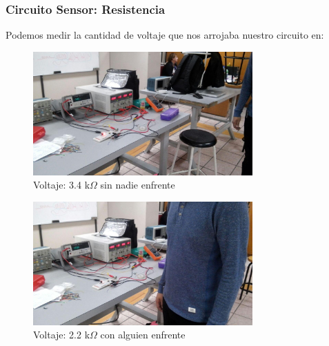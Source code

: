 \documentclass[12pt, fleqn]{article}                            %
\theoremstyle{break}                                            %
\begin{document}
        \clearpage
        \subsubsection{Circuito Sensor: Resistencia}

            Podemos medir la cantidad de voltaje que nos arrojaba nuestro circuito 
            en:
            \begin{figure}[h]
                \centering
                \includegraphics[width=0.75\textwidth]{VoltajeSensorLibre}
                \caption{Voltaje: 3.4 k$\Omega$ sin nadie enfrente}
            \end{figure}

            \begin{figure}[h]
                \centering
                \includegraphics[width=0.75\textwidth]{VoltajeSensorOcupado}
                \caption{Voltaje: 2.2 k$\Omega$ con alguien enfrente}
            \end{figure}
           


        \clearpage
\end{document}
